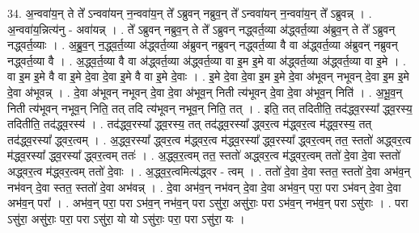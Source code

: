 \documentclass[17pt]{extarticle}
\begin{document}
34. अ॒न्ववा॑य॒न् ते ते᳚ ऽन्ववा॑यन् न॒न्ववा॑य॒न् ते᳚ ऽब्रुवन् नब्रुव॒न् ते᳚ ऽन्ववा॑यन् न॒न्ववा॑य॒न् ते᳚ ऽब्रुवन्न् । . अ॒न्ववा॑य॒न्नित्य॑नु - अवा॑यन्न् । . ते᳚ ऽब्रुवन् नब्रुव॒न् ते ते᳚ ऽब्रुवन् नद्ध्वर्त॒व्या अ॑द्ध्वर्त॒व्या अ॑ब्रुव॒न् ते ते᳚ ऽब्रुवन् नद्ध्वर्त॒व्याः । . अ॒ब्रु॒व॒न् न॒द्ध्व॒र्त॒व्या अ॑द्ध्वर्त॒व्या अ॑ब्रुवन् नब्रुवन् नद्ध्वर्त॒व्या वै वा अ॑द्ध्वर्त॒व्या अ॑ब्रुवन् नब्रुवन् नद्ध्वर्त॒व्या वै । . अ॒द्ध्व॒र्त॒व्या वै वा अ॑द्ध्वर्त॒व्या अ॑द्ध्वर्त॒व्या वा इ॒म इ॒मे वा अ॑द्ध्वर्त॒व्या अ॑द्ध्वर्त॒व्या वा इ॒मे । . वा इ॒म इ॒मे वै वा इ॒मे दे॒वा दे॒वा इ॒मे वै वा इ॒मे दे॒वाः । . इ॒मे दे॒वा दे॒वा इ॒म इ॒मे दे॒वा अ॑भूवन् नभूवन् दे॒वा इ॒म इ॒मे दे॒वा अ॑भूवन्न् । . दे॒वा अ॑भूवन् नभूवन् दे॒वा दे॒वा अ॑भूव॒न् निती त्य॑भूवन् दे॒वा दे॒वा अ॑भूव॒न् निति॑ । . अ॒भू॒व॒न् निती त्य॑भूवन् नभूव॒न् निति॒ तत् तदि त्य॑भूवन् नभूव॒न् निति॒ तत् । . इति॒ तत् तदितीति॒ तद॑द्ध्व॒रस्या᳚ द्ध्व॒रस्य॒ तदितीति॒ तद॑द्ध्व॒रस्य॑ । . तद॑द्ध्व॒रस्या᳚ द्ध्व॒रस्य॒ तत् तद॑द्ध्व॒रस्या᳚ द्ध्वर॒त्व म॑द्ध्वर॒त्व म॑द्ध्व॒रस्य॒ तत् तद॑द्ध्व॒रस्या᳚ द्ध्वर॒त्वम् । . अ॒द्ध्व॒रस्या᳚ द्ध्वर॒त्व म॑द्ध्वर॒त्व म॑द्ध्व॒रस्या᳚ द्ध्व॒रस्या᳚ द्ध्वर॒त्वम् तत॒ स्ततो॑ अद्ध्वर॒त्व म॑द्ध्व॒रस्या᳚ द्ध्व॒रस्या᳚ द्ध्वर॒त्वम् ततः॑ । . अ॒द्ध्व॒र॒त्वम् तत॒ स्ततो॑ अद्ध्वर॒त्व म॑द्ध्वर॒त्वम् ततो॑ दे॒वा दे॒वा स्ततो॑ अद्ध्वर॒त्व म॑द्ध्वर॒त्वम् ततो॑ दे॒वाः । . अ॒द्ध्व॒र॒त्वमित्य॑द्ध्वर - त्वम् । . ततो॑ दे॒वा दे॒वा स्तत॒ स्ततो॑ दे॒वा अभ॑व॒न् नभ॑वन् दे॒वा स्तत॒ स्ततो॑ दे॒वा अभ॑वन्न् । . दे॒वा अभ॑व॒न् नभ॑वन् दे॒वा दे॒वा अभ॑व॒न् परा॒ परा ऽभ॑वन् दे॒वा दे॒वा अभ॑व॒न् परा᳚ । . अभ॑व॒न् परा॒ परा ऽभ॑व॒न् नभ॑व॒न् परा ऽसु॑रा॒ असु॑राः॒ परा ऽभ॑व॒न् नभ॑व॒न् परा ऽसु॑राः । . परा ऽसु॑रा॒ असु॑राः॒ परा॒ परा ऽसु॑रा॒ यो यो ऽसु॑राः॒ परा॒ परा ऽसु॑रा॒ यः । \newline
\end{document}
